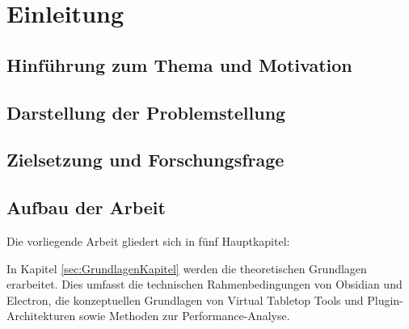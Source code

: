 


\chapter{Einleitung}
\label{sec:Einleitung}

\section{Hinführung zum Thema und Motivation}

\section{Darstellung der Problemstellung}

\section{Zielsetzung und Forschungsfrage}

\section{Aufbau der Arbeit}

Die vorliegende Arbeit gliedert sich in fünf Hauptkapitel:

In Kapitel \autoref{sec:GrundlagenKapitel} werden die theoretischen Grundlagen erarbeitet. Dies umfasst die technischen Rahmenbedingungen von Obsidian und Electron, die konzeptuellen Grundlagen von Virtual Tabletop Tools und Plugin-Architekturen sowie Methoden zur Performance-Analyse.

